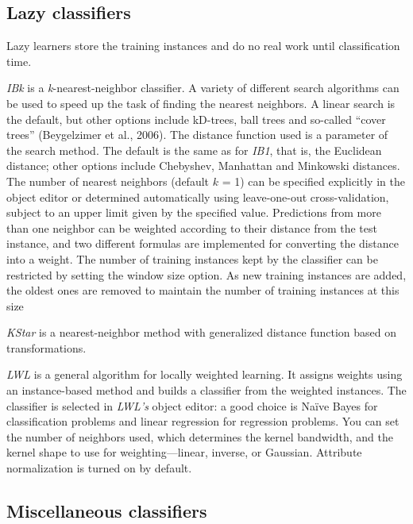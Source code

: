 \subsection{Lazy classifiers}

Lazy learners store the training instances and do no real work until
classification time.

\textit{IBk} is a \textit{k}-nearest-neighbor classifier. A variety of
different search algorithms can be used to speed up the task of
finding the nearest neighbors. A linear search is the default, but
other options include kD-trees, ball trees and so-called ``cover
trees'' (Beygelzimer et al., 2006). The distance function used is a
parameter of the search method. The default is the same as for
\textit{IB1}, that is, the Euclidean distance; other options include
Chebyshev, Manhattan and Minkowski distances. The number of nearest
neighbors (default $k$ = 1) can be specified explicitly in the object
editor or determined automatically using leave-one-out
cross-validation, subject to an upper limit given by the specified
value. Predictions from more than one neighbor can be weighted
according to their distance from the test instance, and two different
formulas are implemented for converting the distance into a
weight. The number of training instances kept by the classifier can be
restricted by setting the window size option. As new training
instances are added, the oldest ones are removed to maintain the
number of training instances at this size

\textit{KStar} is a nearest-neighbor method with generalized distance
function based on transformations.

\textit{LWL} is a general algorithm for locally weighted learning. It
assigns weights using an instance-based method and builds a classifier
from the weighted instances. The classifier is selected in
\textit{LWL’s} object editor: a good choice is Naïve Bayes for
classification problems and linear regression for regression
problems. You can set the number of neighbors used, which determines
the kernel bandwidth, and the kernel shape to use for
weighting—linear, inverse, or Gaussian. Attribute normalization is
turned on by default.

\subsection{Miscellaneous classifiers}

